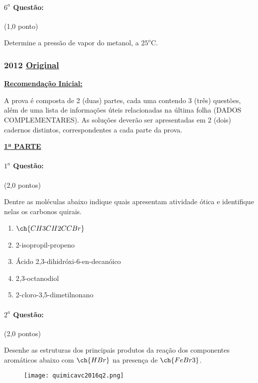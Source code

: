 \documentclass[12pt,a4paper]{article}
\newcommand{\original}[1]{\tiny \href{#1}{Original} \normalsize}
\begin{document}
\paragraph{$6^a$ Questão:} (1,0 ponto)

Determine a pressão de vapor do metanol, a $25^o$C.
\newpage


\subsubsection{2012 \original{https://drive.google.com/file/d/109v3NYZGyJRv-mjXadDJ39AyZmtd75M_/view?usp=sharing}}

\underline{\textbf{Recomendação Inicial:}}

\vspace{0.5cm}
A prova é composta de 2 (duas) partes, cada uma contendo 3 (três) questões, além de uma lista de informações úteis relacionadas
na última folha (DADOS COMPLEMENTARES). As soluções deverão ser apresentadas em 2 (dois) cadernos distintos, correspondentes a cada parte da prova.
\vspace{1.3cm}
\begin{center}
\underline{\textbf{1ª PARTE}}
\end{center}
\paragraph{$1^a$ Questão:} (2,0 pontos)

Dentre as moléculas abaixo indique quais apresentam atividade ótica e identifique nelas os carbonos quirais.
\begin{enumerate}[label=\alph*)]
\item $\ch{CH3CH2CCBr}$
\item 2-isopropil-propeno
\item Ácido 2,3-dihidróxi-6-en-decanóico
\item 2,3-octanodiol
\item 2-cloro-3,5-dimetilnonano
\end{enumerate}

\paragraph{$2^a$ Questão:} (2,0 pontos)

Desenhe as estruturas dos principais produtos da reação dos componentes aromáticos abaixo com $\ch{HBr}$ na presença de $\ch{FeBr3}$.

\begin{figure}[ht]
\centering
\texttt{[image: quimicavc2016q2.png]}
\end{figure}
\end{document}

